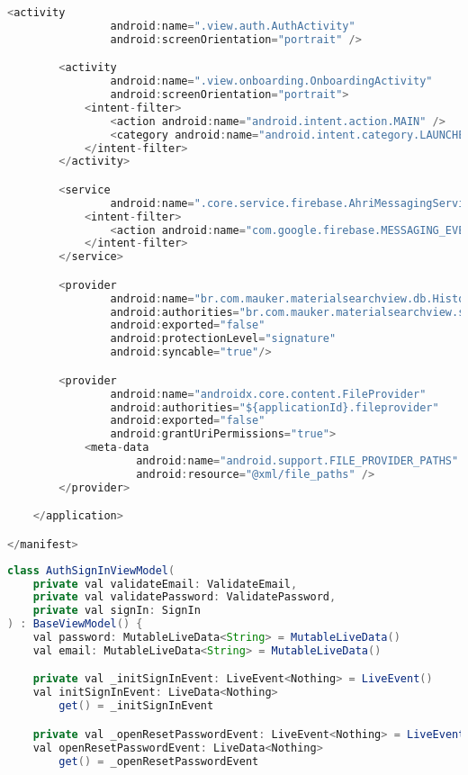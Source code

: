 \begin{asection}
\begin{lstlisting}[language=Java,label={lst:add:a_5}, caption={AndroidManifest.xml}]
        <activity
                android:name=".view.auth.AuthActivity"
                android:screenOrientation="portrait" />

        <activity
                android:name=".view.onboarding.OnboardingActivity"
                android:screenOrientation="portrait">
            <intent-filter>
                <action android:name="android.intent.action.MAIN" />
                <category android:name="android.intent.category.LAUNCHER" />
            </intent-filter>
        </activity>

        <service
                android:name=".core.service.firebase.AhriMessagingService">
            <intent-filter>
                <action android:name="com.google.firebase.MESSAGING_EVENT"/>
            </intent-filter>
        </service>

        <provider
                android:name="br.com.mauker.materialsearchview.db.HistoryProvider"
                android:authorities="br.com.mauker.materialsearchview.searchhistorydatabase"
                android:exported="false"
                android:protectionLevel="signature"
                android:syncable="true"/>

        <provider
                android:name="androidx.core.content.FileProvider"
                android:authorities="${applicationId}.fileprovider"
                android:exported="false"
                android:grantUriPermissions="true">
            <meta-data
                    android:name="android.support.FILE_PROVIDER_PATHS"
                    android:resource="@xml/file_paths" />
        </provider>

    </application>

</manifest>
\end{lstlisting}
\hfill \break
\begin{lstlisting}[language=Java,label={lst:add:a_6}, caption={AuthSignInViewModel}]
class AuthSignInViewModel(
    private val validateEmail: ValidateEmail,
    private val validatePassword: ValidatePassword,
    private val signIn: SignIn
) : BaseViewModel() {
    val password: MutableLiveData<String> = MutableLiveData()
    val email: MutableLiveData<String> = MutableLiveData()

    private val _initSignInEvent: LiveEvent<Nothing> = LiveEvent()
    val initSignInEvent: LiveData<Nothing>
        get() = _initSignInEvent

    private val _openResetPasswordEvent: LiveEvent<Nothing> = LiveEvent()
    val openResetPasswordEvent: LiveData<Nothing>
        get() = _openResetPasswordEvent


\end{lstlisting}
\end{asection}
